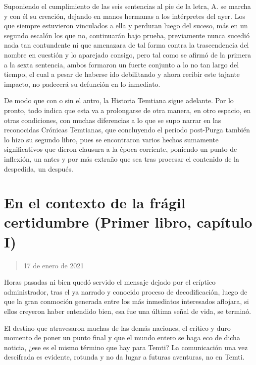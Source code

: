 \documentclass[
]{book}
\begin{document}
Suponiendo el cumplimiento de las seis sentencias al pie de la letra, A. se marcha y con él su creación, dejando en manos hermanas a los intérpretes del ayer. Los que siempre estuvieron vinculados a ella y perduran luego del suceso, más en un segundo escalón los que no, continuarán bajo prueba, previamente nunca sucedió nada tan contundente ni que amenazara de tal forma contra la trascendencia del nombre en cuestión y lo aparejado consigo, pero tal como se afirmó de la primera a la sexta sentencia, ambos formaron un fuerte conjunto a lo no tan largo del tiempo, el cual a pesar de haberse ido debilitando y ahora recibir este tajante impacto, no padecerá su defunción en lo inmediato.

De modo que con o sin el antro, la Historia Temtiana sigue adelante. Por lo pronto, todo indica que esta va a prolongarse de otra manera, en otro espacio, en otras condiciones, con muchas diferencias a lo que se supo narrar en las reconocidas Crónicas Temtianas, que concluyendo el periodo post-Purga también lo hizo su segundo libro, pues se encontraron varios hechos sumamente significativos que dieron clausura a la época corriente, poniendo un punto de inflexión, un antes y por más extraño que sea tras procesar el contenido de la despedida, un después.

\hypertarget{en-el-contexto-de-la-fruxe1gil-certidumbre-primer-libro-capuxedtulo-i}{%
\section{En el contexto de la frágil certidumbre (Primer libro, capítulo I)}\label{en-el-contexto-de-la-fruxe1gil-certidumbre-primer-libro-capuxedtulo-i}}

\begin{quote}
17 de enero de 2021
\end{quote}

Horas pasadas ni bien quedó servido el mensaje dejado por el críptico administrador, tras el ya narrado y conocido proceso de decodificación, luego de que la gran conmoción generada entre los más inmediatos interesados aflojara, si ellos creyeron haber entendido bien, esa fue una última señal de vida, se terminó.

El destino que atravesaron muchas de las demás naciones, el crítico y duro momento de poner un punto final y que el mundo entero se haga eco de dicha noticia, ¿ese es el mismo término que hay para Temti? La comunicación una vez descifrada es evidente, rotunda y no da lugar a futuras aventuras, no en Temti.
\end{document}

